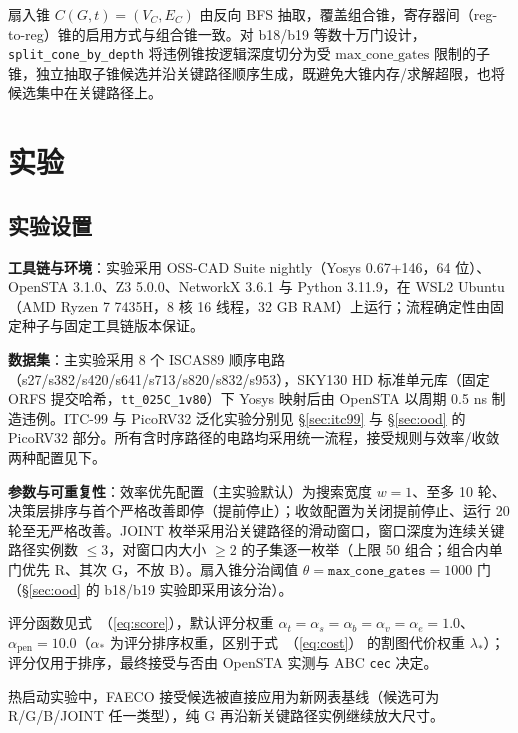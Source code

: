 \documentclass[journal]{IEEEtran}
\renewcommand{\eqref}[1]{\textup{（\ref{#1}）}}
\begin{document}
扇入锥 $C(G, t) = (V_C, E_C)$ 由反向 BFS 抽取，覆盖组合锥，寄存器间（reg-to-reg）锥的启用方式与组合锥一致。对 b18/b19 等数十万门设计，\texttt{split\_cone\_by\_depth} 将违例锥按逻辑深度切分为受 $\mathrm{max\_cone\_gates}$ 限制的子锥，独立抽取子锥候选并沿关键路径顺序生成，既避免大锥内存/求解超限，也将候选集中在关键路径上。

\section{实验}\label{sec:exp}

\subsection{实验设置}\label{sec:setup}

\textbf{工具链与环境}：实验采用 OSS-CAD Suite nightly（Yosys 0.67+146，64 位）、OpenSTA 3.1.0、Z3 5.0.0、NetworkX 3.6.1 与 Python 3.11.9，在 WSL2 Ubuntu（AMD Ryzen 7 7435H，8 核 16 线程，32 GB RAM）上运行；流程确定性由固定种子与固定工具链版本保证。

\textbf{数据集}：主实验采用 8 个 ISCAS89 顺序电路（s27/s382/s420/s641/s713/s820/s832/s953），SKY130 HD 标准单元库（固定 ORFS 提交哈希，\texttt{tt\_025C\_1v80}）下 Yosys 映射后由 OpenSTA 以周期 0.5 ns 制造违例。ITC-99 与 PicoRV32 泛化实验分别见 \S\ref{sec:itc99} 与 \S\ref{sec:ood} 的 PicoRV32 部分。所有含时序路径的电路均采用统一流程，接受规则与效率/收敛两种配置见下。

\textbf{参数与可重复性}：效率优先配置（主实验默认）为搜索宽度 $w=1$、至多 10 轮、决策层排序与首个严格改善即停（提前停止）；收敛配置为关闭提前停止、运行 20 轮至无严格改善。JOINT 枚举采用沿关键路径的滑动窗口，窗口深度为连续关键路径实例数 $\le 3$，对窗口内大小 $\ge 2$ 的子集逐一枚举（上限 50 组合；组合内单门优先 R、其次 G，不放 B）。扇入锥分治阈值 $\theta = \texttt{max\_cone\_gates} = 1000$ 门（\S\ref{sec:ood} 的 b18/b19 实验即采用该分治）。

评分函数见式~\eqref{eq:score}，默认评分权重 $\alpha_t=\alpha_s=\alpha_b=\alpha_v=\alpha_e=1.0$、$\alpha_{\mathrm{pen}}=10.0$（$\alpha_*$ 为评分排序权重，区别于式~\eqref{eq:cost} 的割图代价权重 $\lambda_*$）；评分仅用于排序，最终接受与否由 OpenSTA 实测与 ABC \texttt{cec} 决定。

热启动实验中，FAECO 接受候选被直接应用为新网表基线（候选可为 R/G/B/JOINT 任一类型），纯 G 再沿新关键路径实例继续放大尺寸。
\end{document}
